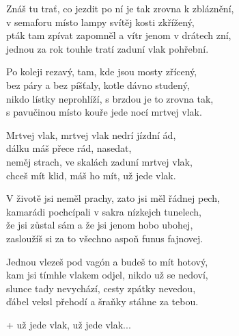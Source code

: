 
\ve{}
Znáš tu trať, co jezdit po ní je tak zrovna k zbláznění,\\
v semaforu místo lampy svítěj kosti zkřížený,\\
pták tam zpívat zapomněl a vítr jenom v drátech zní,\\
jednou za rok touhle tratí zaduní vlak pohřební.

\ve{}
Po koleji rezavý, tam, kde jsou mosty zřícený,\\
bez páry a bez píšťaly, kotle dávno studený,\\
nikdo lístky neprohlíží, s brzdou je to zrovna tak,\\
s pavučinou místo kouře jede nocí mrtvej vlak.

\cho{}
Mrtvej vlak, mrtvej vlak nedrí jízdní ád,\\
dálku máš přece rád, \quad {}nasedat,\\
neměj strach, ve skalách zaduní mrtvej vlak,\\
chceš mít klid, máš ho mít, \quad {}už jede vlak.

\ve{}
V životě jsi neměl prachy, zato jsi měl řádnej pech,\\
kamarádi pochcípali v sakra nízkejch tunelech,\\
že jsi zůstal sám a že jsi jenom hobo ubohej,\\
zasloužíš si za to všechno aspoň funus fajnovej.

\ve{}
Jednou vlezeš pod vagón a budeš to mít hotový,\\
kam jsi tímhle vlakem odjel, nikdo už se nedoví,\\
slunce tady nevychází, cesty zpátky nevedou,\\
ďábel veksl přehodí a šraňky stáhne za tebou.

\cho{} + už jede vlak, už jede vlak...

\esong